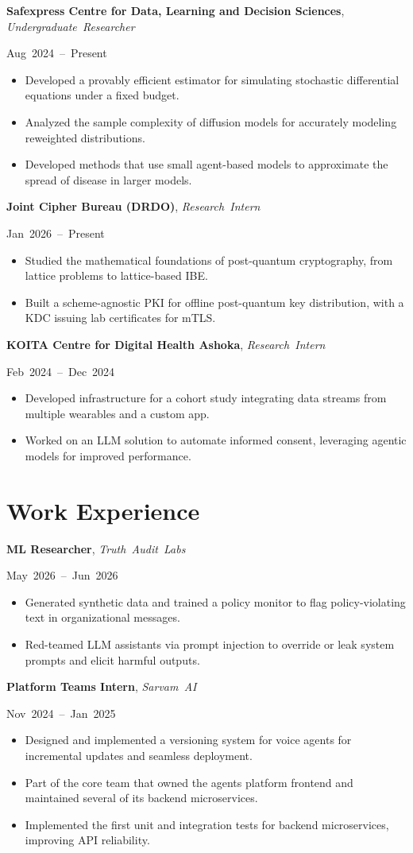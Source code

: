 \documentclass[11pt,letterpaper]{article}
\newlength{\datewidth}
\newcommand{\heading}[3]{%
  \settowidth{\datewidth}{#3}%
  \par\vspace{2pt}\parbox[t]{\dimexpr\linewidth-\datewidth-1em}{\raggedright\textbf{#1}, \mbox{\textit{#2}}}%
  \hfill\mbox{#3}\par}
\newenvironment{bullets}
  {\begin{itemize}[leftmargin=1.2em,label=\textbullet,itemsep=0pt,parsep=0pt,topsep=0pt,partopsep=0pt]}
  {\end{itemize}}
\begin{document}
\heading{Safexpress Centre for Data, Learning and Decision Sciences}{Undergraduate Researcher}{Aug 2024 -- Present}
\begin{bullets}
  \item Developed a provably efficient estimator for simulating stochastic differential equations under a fixed budget.
  \item Analyzed the sample complexity of diffusion models for accurately modeling reweighted distributions.
  \item Developed methods that use small agent-based models to approximate the spread of disease in larger models.
\end{bullets}

\heading{Joint Cipher Bureau (DRDO)}{Research Intern}{Jan 2026 -- Present}
\begin{bullets}
  \item Studied the mathematical foundations of post-quantum cryptography, from lattice problems to lattice-based IBE.
  \item Built a scheme-agnostic PKI for offline post-quantum key distribution, with a KDC issuing lab certificates for mTLS.
\end{bullets}

\heading{KOITA Centre for Digital Health Ashoka}{Research Intern}{Feb 2024 -- Dec 2024}
\begin{bullets}
  \item Developed infrastructure for a cohort study integrating data streams from multiple wearables and a custom app.
  \item Worked on an LLM solution to automate informed consent, leveraging agentic models for improved performance.
\end{bullets}

\section{Work Experience}
\heading{ML Researcher}{Truth Audit Labs}{May 2026 -- Jun 2026}
\begin{bullets}
  \item Generated synthetic data and trained a policy monitor to flag policy-violating text in organizational messages.
  \item Red-teamed LLM assistants via prompt injection to override or leak system prompts and elicit harmful outputs.
\end{bullets}

\heading{Platform Teams Intern}{Sarvam AI}{Nov 2024 -- Jan 2025}
\begin{bullets}
  \item Designed and implemented a versioning system for voice agents for incremental updates and seamless deployment.
  \item Part of the core team that owned the agents platform frontend and maintained several of its backend microservices.
  \item Implemented the first unit and integration tests for backend microservices, improving API reliability.
\end{bullets}
\end{document}
